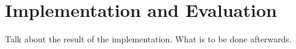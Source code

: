 \section{Implementation and Evaluation}
Talk about the result of the implementation. What is to be done afterwards.
